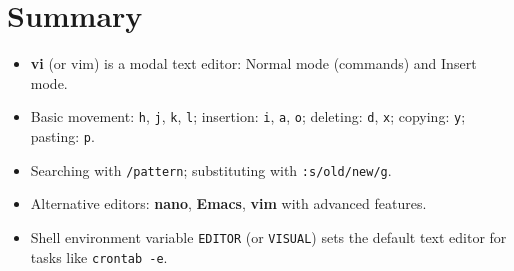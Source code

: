 \documentclass[a4paper]{report}
\begin{document}
\section*{Summary}
\begin{itemize}
    \item \textbf{vi} (or vim) is a modal text editor: Normal mode (commands) and Insert mode.
    \item Basic movement: \texttt{h}, \texttt{j}, \texttt{k}, \texttt{l}; insertion: \texttt{i}, \texttt{a}, \texttt{o}; deleting: \texttt{d}, \texttt{x}; copying: \texttt{y}; pasting: \texttt{p}.
    \item Searching with \texttt{/pattern}; substituting with \texttt{:s/old/new/g}.
    \item Alternative editors: \textbf{nano}, \textbf{Emacs}, \textbf{vim} with advanced features.
    \item Shell environment variable \texttt{EDITOR} (or \texttt{VISUAL}) sets the default text editor for tasks like \texttt{crontab -e}.
\end{itemize}



\newpage
\end{document}
